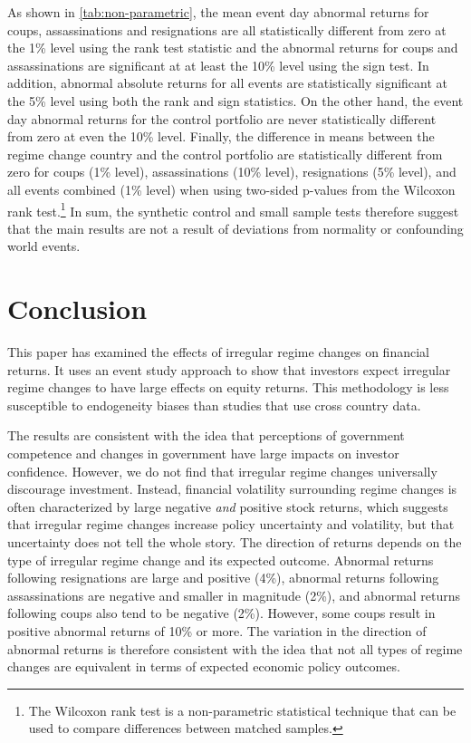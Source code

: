 \documentclass[12pt,final,fleqn]{article}
\theoremstyle{plain}
\begin{document}
As shown in \autoref{tab:non-parametric}, the mean event day abnormal returns for coups, assassinations and resignations are all statistically different from zero at the 1\% level using the rank test statistic and the abnormal returns for coups and assassinations are significant at at least the 10\% level using the sign test. In addition, abnormal absolute returns for all events are statistically significant at the 5\% level using both the rank and sign statistics. On the other hand, the event day abnormal returns for the control portfolio are never statistically different from zero at even the 10\% level. Finally, the difference in means between the regime change country and the control portfolio are statistically different from zero for coups (1\% level), assassinations (10\% level), resignations (5\% level), and all events combined (1\% level) when using two-sided p-values from the Wilcoxon rank test.\footnote{The Wilcoxon rank test is a non-parametric statistical technique that can be used to compare differences between matched samples.} In sum, the synthetic control and small sample tests therefore suggest that the main results are not a result of deviations from normality or confounding world events.

\section{Conclusion}
This paper has examined the effects of irregular regime changes on financial returns. It uses an event study approach to show that investors expect irregular regime changes to have large effects on equity returns. This methodology is less susceptible to endogeneity biases than studies that use cross country data.

The results are consistent with the idea that perceptions of government competence and changes in government have large impacts on investor confidence. However, we do not find that irregular regime changes universally discourage investment. Instead, financial volatility surrounding regime changes is often characterized by large negative \textit{and} positive stock returns, which suggests that irregular regime changes increase policy uncertainty and volatility, but that uncertainty does not tell the whole story. The direction of returns depends on the type of irregular regime change and its expected outcome. Abnormal returns following resignations are large and positive (4\%), abnormal returns following assassinations are negative and smaller in magnitude (2\%), and abnormal returns following coups also tend to be negative (2\%). However, some coups result in positive abnormal returns of 10\% or more. The variation in the direction of abnormal returns is therefore consistent with the idea that not all types of regime changes are equivalent in terms of expected economic policy outcomes. 
\end{document}
